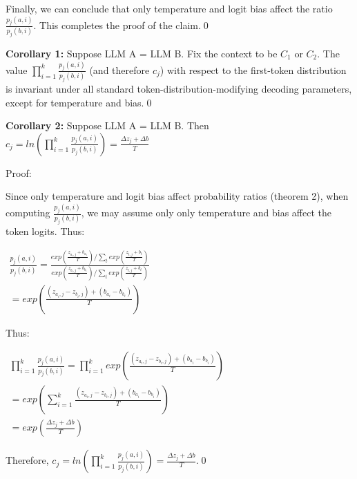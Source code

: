 \documentclass{article}
\begin{document}
Finally, we can conclude that only temperature and logit bias affect the ratio $\displaystyle \frac{p_{j}\left( a,i\right)}{p_{j}\left( b,i\right)}$. This completes the proof of the claim.\qed 



\textbf{Corollary 1:} Suppose LLM A = LLM B. Fix the context to be $\displaystyle C_{1}$ or $\displaystyle C_{2}$. The value $\displaystyle \prod _{i=1}^{k}\frac{p_{j}\left( a,i\right)}{p_{j}\left( b,i\right)}$ (and therefore $\displaystyle c_{j}$) with respect to the first-token distribution is invariant under all standard token-distribution-modifying decoding parameters, except for temperature and bias.\qed 



\textbf{Corollary 2:} Suppose LLM A = LLM B. Then $\displaystyle c_{j} =ln\left(\prod _{i=1}^{k}\frac{p_{j}\left( a,i\right)}{p_{j}\left( b,i\right)}\right) =\frac{\Delta z_{j} +\Delta b}{T}$

Proof:

Since only temperature and logit bias affect probability ratios (theorem 2), when computing $\displaystyle \frac{p_{j}\left( a,i\right)}{p_{j}\left( b,i\right)}$, we may assume only only temperature and bias affect the token logits. Thus:

$\displaystyle \begin{array}{l}
\frac{p_{j}\left( a,i\right)}{p_{j}\left( b,i\right)} =\frac{exp\left(\frac{z_{a_{i} ,j} +b_{a_{i}}}{T}\right) /\sum _{t} exp\left(\frac{z_{t,j} +b_{t}}{T}\right)}{exp\left(\frac{z_{b_{i} ,j} +b_{b_{i}}}{T}\right) /\sum _{t} exp\left(\frac{z_{t,j} +b_{t}}{T}\right)}\\
=exp\left(\frac{\left( z_{a_{i} ,j} -z_{b_{i} ,j}\right) +\left( b_{a_{i}} -b_{b_{i}}\right)}{T}\right)
\end{array}$

Thus:

$\displaystyle  \begin{array}{l}
\prod _{i=1}^{k}\frac{p_{j}\left( a,i\right)}{p_{j}\left( b,i\right)} =\prod _{i=1}^{k} exp\left(\frac{\left( z_{a_{i} ,j} -z_{b_{i} ,j}\right) +\left( b_{a_{i}} -b_{b_{i}}\right)}{T}\right)\\
=exp\left(\sum _{i=1}^{k}\frac{\left( z_{a_{i} ,j} -z_{b_{i} ,j}\right) +\left( b_{a_{i}} -b_{b_{i}}\right)}{T}\right)\\
=exp\left(\frac{\Delta z_{j} +\Delta b}{T}\right)
\end{array}$

Therefore, $\displaystyle c_{j} =ln\left(\prod _{i=1}^{k}\frac{p_{j}\left( a,i\right)}{p_{j}\left( b,i\right)}\right) =\frac{\Delta z_{j} +\Delta b}{T}$.\qed 
\end{document}
